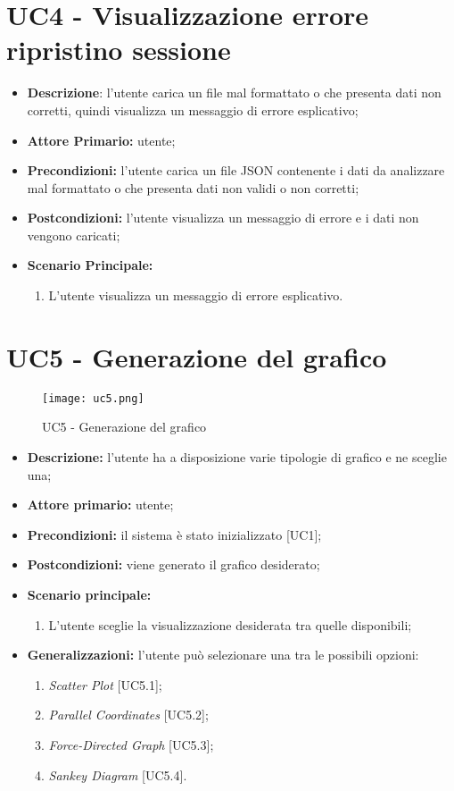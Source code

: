 \section{UC4 - Visualizzazione errore ripristino sessione}
\begin{itemize}
  \item \textbf{Descrizione}: l'utente carica un file mal formattato o che presenta dati non corretti, quindi visualizza un messaggio di errore esplicativo;
  \item \textbf{Attore Primario:} utente;
  \item \textbf{Precondizioni:} l’utente carica un file JSON contenente i dati da analizzare mal formattato o che presenta dati non validi o non corretti;
  \item \textbf{Postcondizioni:} l'utente visualizza un messaggio di errore e i dati non vengono caricati;
  \item \textbf{Scenario Principale:}
  \begin{enumerate}
    \item L'utente visualizza un messaggio di errore esplicativo.
  \end{enumerate}
\end{itemize}

\section{UC5 - Generazione del grafico}
\begin{figure}[H]
 \texttt{[image: uc5.png]}
 \caption{UC5 - Generazione del grafico}
\end{figure}

 \begin{itemize}
     \item \textbf{Descrizione:} l'utente ha a disposizione varie tipologie di grafico e ne sceglie una;
     \item \textbf{Attore primario:} utente;
     \item \textbf{Precondizioni:} il sistema è stato inizializzato [UC1];
     \item \textbf{Postcondizioni:} viene generato il grafico desiderato;
     \item \textbf{Scenario principale:}
     \begin{enumerate}
       \item L'utente sceglie la visualizzazione desiderata tra quelle disponibili;
     \end{enumerate}
     \item \textbf{Generalizzazioni:} l'utente può selezionare una tra le possibili opzioni:
     \begin{enumerate}
         \item \textit{Scatter Plot} [UC5.1];
         \item \textit{Parallel Coordinates} [UC5.2];
         \item \textit{Force-Directed Graph} [UC5.3];
         \item \textit{Sankey Diagram} [UC5.4].
     \end{enumerate}
 \end{itemize}

